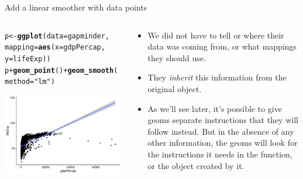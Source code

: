 \documentclass[10pt]{beamer}\usepackage[]{graphicx}\usepackage[]{color}
\makeatletter
\def\maxwidth{ %
  \ifdim\Gin@nat@width>\linewidth
    \linewidth
  \else
    \Gin@nat@width
  \fi
}
\newcommand{\hlstr}[1]{\textcolor[rgb]{0.192,0.494,0.8}{#1}}%
\newcommand{\hlopt}[1]{\textcolor[rgb]{0,0,0}{#1}}%
\newcommand{\hlstd}[1]{\textcolor[rgb]{0.345,0.345,0.345}{#1}}%
\newcommand{\hlkwb}[1]{\textcolor[rgb]{0.69,0.353,0.396}{#1}}%
\newcommand{\hlkwc}[1]{\textcolor[rgb]{0.333,0.667,0.333}{#1}}%
\newcommand{\hlkwd}[1]{\textcolor[rgb]{0.737,0.353,0.396}{\textbf{#1}}}%
\newenvironment{kframe}{%
 \def\at@end@of@kframe{}%
 \ifinner\ifhmode%
  \def\at@end@of@kframe{\end{minipage}}%
  \begin{minipage}{\columnwidth}%
 \fi\fi%
 \def\FrameCommand##1{\hskip\@totalleftmargin \hskip-\fboxsep
 \colorbox{shadecolor}{##1}\hskip-\fboxsep
     \hskip-\linewidth \hskip-\@totalleftmargin \hskip\columnwidth}%
 \MakeFramed {\advance\hsize-\width
   \@totalleftmargin\z@ \linewidth\hsize
   \@setminipage}}%
 {\par\unskip\endMakeFramed%
 \at@end@of@kframe}
\newenvironment{knitrout}{}{} %
\makeatother
\begin{document}
\begin{frame}[fragile]{Add a linear smoother with data points}
	\begin{columns}
		\begin{column}{0.5\textwidth}  %
\begin{knitrout}\tiny
{}\color{fgcolor}\begin{kframe}
\begin{alltt}
\hlstd{p} \hlkwb{<-} \hlkwd{ggplot}\hlstd{(}\hlkwc{data} \hlstd{= gapminder,}
\hlkwc{mapping} \hlstd{=} \hlkwd{aes}\hlstd{(}\hlkwc{x} \hlstd{= gdpPercap,}
\hlkwc{y}\hlstd{=lifeExp))}
\hlstd{p} \hlopt{+} \hlkwd{geom_point}\hlstd{()} \hlopt{+} \hlkwd{geom_smooth}\hlstd{(}\hlkwc{method} \hlstd{=} \hlstr{"lm"}\hlstd{)}
\end{alltt}


{\ttfamily\noindent\itshape{}}\end{kframe}

{\centering \includegraphics[width=\maxwidth]{figure/unnamed-chunk-8-1} 

}


\end{knitrout}
		\end{column}\pause 
		\begin{column}{0.5\textwidth}
			\begin{itemize}
				\item We did not have to tell  or 
				where their data was coming from, or what mappings they should use.
\pause	\item 			They \textit{inherit} this information from the original  object. 
	\item As we'll see later, it’s possible to give geoms separate instructions that they
				will follow instead. But in the absence of any other information, the
				geoms will look for the instructions it needs in the 
				function, or the object created by it.
			\end{itemize}
		\end{column}
	\end{columns}
\end{frame}
\end{document}

